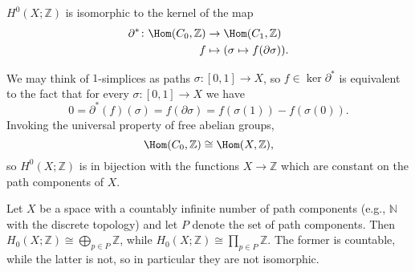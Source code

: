 $H^0(X; \mathbb{Z})$ is isomorphic to the kernel of the map
\begin{align*}
	\partial^*\colon \Hom(C_0, \mathbb{Z})&\to \Hom(C_1, \mathbb{Z})\\
	f&\mapsto (\sigma \mapsto f(\partial \sigma)).
\end{align*}

We may think of $1$-simplices as paths $\sigma\colon[0, 1]\to X$, so
$f \in \ker\partial^*$ is equivalent to the fact that for every $\sigma\colon [0, 1]\to X$
we have \[ 0 = \partial^*(f)(\sigma) = f(\partial \sigma) = f(\sigma(1)) - f(\sigma(0)). \]
Invoking the universal property of free abelian groups,
\[ \Hom(C_0, \mathbb{Z}) \cong \Hom(X, \mathbb{Z}), \]
so $H^0(X; \mathbb{Z})$ is in bijection with the functions $X\to \mathbb{Z}$ which
are constant on the path components of $X$.

Let $X$ be a space with a countably infinite number of path components
(e.g., $\mathbb{N}$ with the discrete topology) and let $P$ denote the set of
path components. Then
$H_0(X; \mathbb{Z}) \cong \bigoplus_{p \in P} \mathbb{Z}$, while
$H_0(X; \mathbb{Z})\cong \prod_{p \in P} \mathbb{Z}$. The former is countable,
while the latter is not, so in particular they are not isomorphic.

